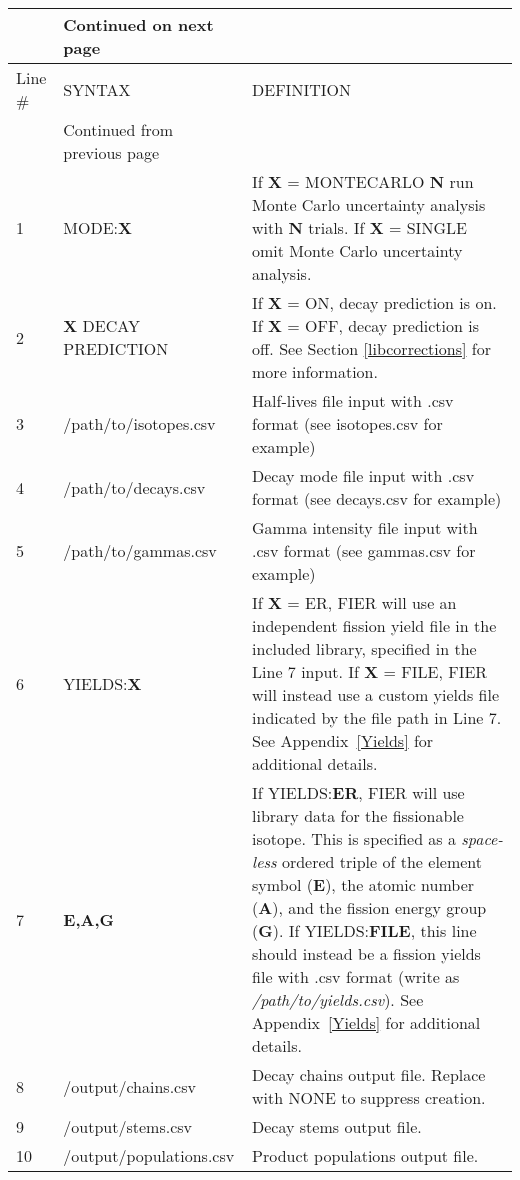 \documentclass{article}
\begin{document}
\begin{appendices}
\begin{longtable}{p{}p{} p{}}
    \hline &Continued on next page&\\ \hline
    \endfoot
        
    \hline Line \# & SYNTAX & DEFINITION \\ \hline
    \endfirsthead
    
    \hline &Continued from previous page&\\ \hline
    \endhead
    
     \endlastfoot
        
        1&MODE:\textbf{X} & If \textbf{X} = MONTECARLO \textbf{N} run Monte Carlo uncertainty analysis with \textbf{N} trials. If \textbf{X} = SINGLE omit Monte Carlo uncertainty  analysis. \\
        2&\textbf{X} DECAY PREDICTION & If \textbf{X} = ON, decay prediction is on. If \textbf{X} = OFF, decay prediction is off. See Section \ref{libcorrections} for more information.\\
        3&/path/to/isotopes.csv & Half-lives file input with .csv format (see isotopes.csv for example)\\
        4&/path/to/decays.csv & Decay mode file input with .csv format (see decays.csv for example) \\
        5&/path/to/gammas.csv & Gamma intensity file input with .csv format (see gammas.csv for example)\\
        6&YIELDS:\textbf{X}& If \textbf{X} = ER, FIER will use an independent fission yield file in the included library, specified in the Line 7 input. If \textbf{X} = FILE, FIER will instead use a custom yields file indicated by the file path in Line 7. See Appendix~\ref{Yields} for additional details. \\
        7&\textbf{E,A,G} & If YIELDS:\textbf{ER}, FIER will use library data for the fissionable isotope. This is specified as a \textit{space-less} ordered triple of the element symbol (\textbf{E}), the atomic number (\textbf{A}), and the fission energy group (\textbf{G}). If YIELDS:\textbf{FILE}, this line should instead be a fission yields file with .csv format (write as \textit{/path/to/yields.csv}). See Appendix~\ref{Yields} for additional details. \\
        8&/output/chains.csv & Decay chains output file. Replace with NONE to suppress creation.\\
        9&/output/stems.csv & Decay stems output file.\\
        10&/output/populations.csv & Product populations output file.\\

\end{longtable}
\end{appendices}
\end{document}
